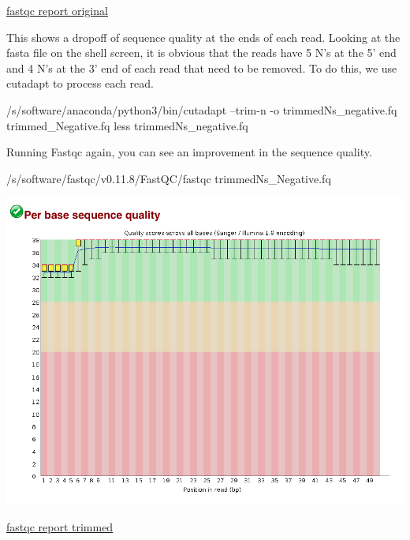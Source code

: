 \documentclass[]{article}
\newenvironment{Shaded}{\begin{snugshade}}{\end{snugshade}}
\newcommand{\FunctionTok}[1]{\textcolor[rgb]{0.00,0.00,0.00}{#1}}
\newcommand{\ExtensionTok}[1]{#1}
\newcommand{\NormalTok}[1]{#1}
\begin{document}
\href{/d/projects/u/sj003/course_materials/fastq/coursework_1/trimmed_Negative_fastqc.html}{fastqc
report original}

This shows a dropoff of sequence quality at the ends of each read.
Looking at the fasta file on the shell screen, it is obvious that the
reads have 5 N's at the 5' end and 4 N's at the 3' end of each read that
need to be removed. To do this, we use cutadapt to process each read.

\begin{Shaded}
\begin{Highlighting}[]
\ExtensionTok{/s/software/anaconda/python3/bin/cutadapt}\NormalTok{ --trim-n -o trimmedNs_negative.fq trimmed_Negative.fq}
\FunctionTok{less}\NormalTok{ trimmedNs_negative.fq}
\end{Highlighting}
\end{Shaded}

Running Fastqc again, you can see an improvement in the sequence
quality.

\begin{Shaded}
\begin{Highlighting}[]
\ExtensionTok{/s/software/fastqc/v0.11.8/FastQC/fastqc}\NormalTok{ trimmedNs_Negative.fq}
\end{Highlighting}
\end{Shaded}

\includegraphics{trimmedNs_negative_fastqc.png}

\href{/d/projects/u/sj003/course_materials/fastq/coursework_1/trimmedNs_Negative_fastqc.html}{fastqc
report trimmed}
\end{document}
